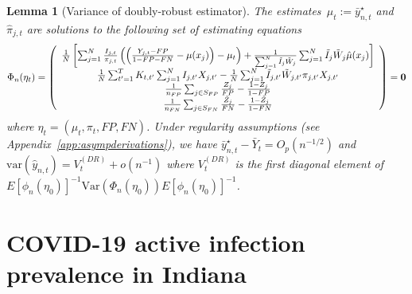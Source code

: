 \documentclass[11pt]{amsart}
\numberwithin{equation}{section}
\theoremstyle{plain}
\newtheorem{lemma}[theorem]{Lemma}
\begin{document}
\begin{lemma}[Variance of doubly-robust estimator] \normalfont
\label{lemma:dr}
The estimates~$\mu_t := \bar y_{n,t}^\star$ and $\hat \pi_{j,t}$
are solutions to the following set of estimating equations
$$
\Phi_n (\eta_t) =
\left (
\begin{array}{c}
\frac{1}{N} \left[ \sum_{j=1}^N \frac{I_{j,t}}{\pi_{j,t}} \left( \left( \frac{Y_{j,t} - FP}{1-FP-FN} - \mu(x_j)  \right)  - \mu_t \right) + \frac{1}{\sum_{j=1}^N \tilde I_j \tilde W_j} \sum_{j=1}^N  \tilde I_j \tilde W_j \hat \mu (x_j) \right] \\
\frac{1}{N} \sum_{t^\prime = 1}^T K_{t,t^\prime} \sum_{j=1}^N I_{j,t^\prime} X_{j,t^\prime} - \frac{1}{N} \sum_{j = 1}^N \tilde I_{j,t^\prime} \tilde W_{j,t^\prime}  \pi_{j,t^\prime} X_{j,t^\prime}  \\
\frac{1}{n_{FP}} \sum_{j \in S_{FP}} \frac{Z_j}{FP} - \frac{1-Z_j}{1-FP} \\
\frac{1}{n_{FN}} \sum_{j \in S_{FN}} \frac{\tilde Z_j}{FN} - \frac{1-\tilde Z_j}{1-FN} \\
\end{array}
\right ) = {\bf 0}
$$
where $\eta_t = (\mu_t, \pi_t, FP, FN)$. Under regularity assumptions (see Appendix~\ref{app:asympderivations}), we have $\bar y_{n,t}^\star - \bar Y_{t} = O_p (n^{-1/2})$ and $\text{var} (\hat y_{n,t}) = V_{t}^{(DR)} + o (n^{-1})$ where $V_t^{(DR)}$ is the first diagonal element of $E [\phi_n(\eta_0)]^{-1} \text{Var}(\Phi_n(\eta_0))E [\phi_n(\eta_0)]^{-1}$.
\end{lemma}


\section{COVID-19 active infection prevalence in Indiana}
\label{section:applications}

\end{document}
